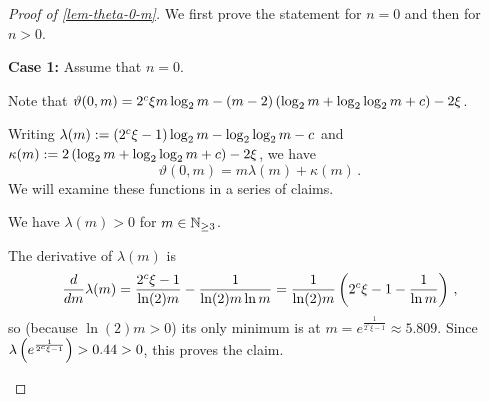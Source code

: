\begin{proof}[Proof of \cref{lem-theta-0-m}] \label{proof-lem-theta-0-m}
 We first prove the statement for $n = 0$ and then for $n > 0$.

   \textbf{Case 1:} Assume that $n = 0$.

   Note that $\vartheta(0, m) = 2^{c} \xi m \log_2 m - (m - 2) \left({\log_2 m + \log_2 \log_2 m + c}\right) - 2 \xi $.

   Writing
   $\lambda(m) := \left({2^c\xi - 1}\right) \log_2 m - \log_2 \log_2 m - c$
   and
   $\kappa(m) :=2\left({\log_2 m + \log_2 \log_2 m + c}\right) -2\xi$,
   we have
   \begin{equation}
    \vartheta(0, m) = m \lambda(m) + \kappa(m)\,. \label{rewrite-theta}
   \end{equation}
   We will examine these functions in a series of claims.


   \begin{claim} \label{claim-lambda}
    We have $\lambda(m) > 0 $ for $m \in \mathbb N_{\geq 3}$.
    \begin{proof_of_claim}
   The derivative of $\lambda(m)$ is
   \begin{equation}
    \frac{d}{dm} \lambda(m) =\frac{2^c\xi - 1}{\ln (2) m} - \frac{1}{\ln(2) m \ln m}
                            = \frac{1}{\ln(2) m} \left({2^c\xi - 1 - \frac{1}{\ln m }}\right)\,, \label{lambda-derived}
   \end{equation}
   so (because $\ln (2) m > 0$)
   its only minimum is at $m=e^{\frac{1}{2^c\xi-1}} \approx 5.809$.
   Since $\lambda \left({e^{\frac{1}{2^c\xi-1}}}\right) > 0.44 > 0$, this proves the claim.
   \end{proof_of_claim}
   \end{claim}


\end{proof}
